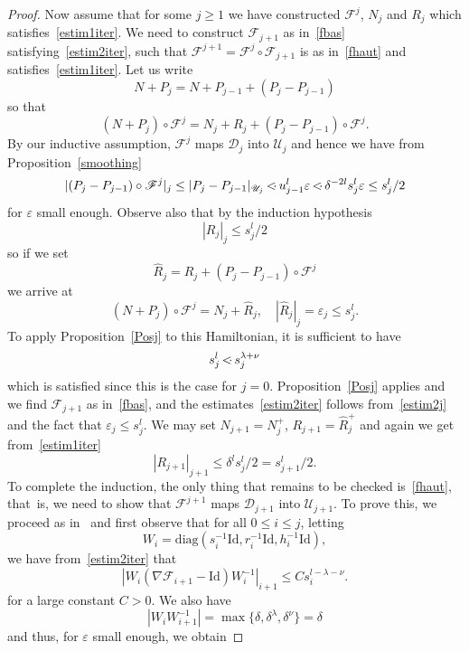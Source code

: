 \documentclass[JEP,XML,SOM,Unicode]{cedram}
\let\mathcal\mathscr
\numberwithin{equation}{section}
\theoremstyle{plain}
\theoremstyle{definition}
\newcommand\MP{\,{<\hspace{-.5em}\cdot}\,}
\begin{document}
\begin{proof}
Now assume that for some $j \geq 1$ we have constructed $\mathcal{F}^j$, $N_{j}$ and $R_{j}$ which satisfies~\eqref{estim1iter}. We need to construct $\mathcal{F}_{j+1}$ as in~\eqref{fbas} satisfying~\eqref{estim2iter}, such that $\mathcal{F}^{j+1}=\mathcal{F}^j \circ \mathcal{F}_{j+1}$ is as in~\eqref{fhaut} and satisfies~\eqref{estim1iter}. Let us write
\[ N+P_{j}=N+P_{j-1} +(P_{j} -P_{j-1}) \]
so that
\[ (N+P_{j})\circ \mathcal{F}^j=N_j+R_j+(P_{j} -P_{j-1}) \circ \mathcal{F}^j .\]
By our inductive assumption, $\mathcal{F}^j$ maps $\mathcal{D}_{j}$ into $\mathcal{U}_j$ and hence we have from Proposition~\ref{smoothing}
\[|(P_{j}-P_{j-1}) \circ\mathcal{F}^j|_{j} \leq |P_{j}-P_{j-1}|_{\mathcal{U}_j} \MP u_{j-1}^l\varepsilon \MP \delta^{-2l}s_j^l\varepsilon \leq s_j^l/2 \]
for $\varepsilon$ small enough. Observe also that by the induction hypothesis
\[ |R_{j}|_{j} \leq s_{j}^l/2 \]
so if we set
\[ \hat{R}_j=R_j+(P_{j} -P_{j-1}) \circ \mathcal{F}^j \]
we arrive at
\[ (N+P_{j})\circ \mathcal{F}^j=N_j+\hat{R}_j, \quad |\hat{R}_j|_{j}=\varepsilon_j \leq s_j^l. \]
To apply Proposition~\ref{Posj} to this Hamiltonian, it is sufficient to have
\begin{equation*}
s_j^l \MP s_j^{\lambda+\nu}
\end{equation*}
which is satisfied since this is the case for $j=0$. Proposition~\ref{Posj} applies and we find $\mathcal{F}_{j+1}$ as in~\eqref{fbas}, and the estimates~\eqref{estim2iter} follows from~\eqref{estim2j} and the fact that $\varepsilon_j\leq s_j^l$. We may set $N_{j+1}=N_j^+$, $R_{j+1}=\hat{R}_j^+$ and again we get from~\eqref{estim1iter}
\[ |R_{j+1}|_{j+1} \leq \delta^ls_j^l/2= s_{j+1}^l/2. \]
To complete the induction, the only thing that remains to be checked is~\eqref{fhaut}, that~is, we need to show that $\mathcal{F}^{j+1}$ maps $\mathcal{D}_{j+1}$ into $\mathcal{U}_{j+1}$. To prove this, we proceed as in~\cite{Pop04} and first observe that for all $0 \leq i \leq j$, letting
\[
W_i=\mathrm{diag}(s_i^{-1}\mathrm{Id},r_i^{-1}\mathrm{Id},h_i^{-1}\mathrm{Id}),
\]
we have from~\eqref{estim2iter} that
\begin{equation}\label{estweight1}
|W_i(\nabla \mathcal{F}_{i+1}-\mathrm{Id})W_i^{-1}|_{i+1} \leq C s_{i}^{l-\lambda-\nu}.
\end{equation}
for a large constant $C>0$. We also have
\begin{equation}\label{estweight2}
|W_i W_{i+1}^{-1}|=\max\{\delta,\delta^\lambda,\delta^\nu\}=\delta
\end{equation}
and thus, for $\varepsilon$ small enough, we obtain

\end{proof}
\end{document}

